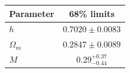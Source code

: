 \begin{tabular} { l  c}

 Parameter &  68\% limits\\
\hline
{\boldmath$h              $} & $0.7020\pm 0.0083          $\\

{\boldmath$Ω_m            $} & $0.2847\pm 0.0089          $\\

{\boldmath$M              $} & $0.29^{+0.37}_{-0.44}      $\\
\hline
\end{tabular}